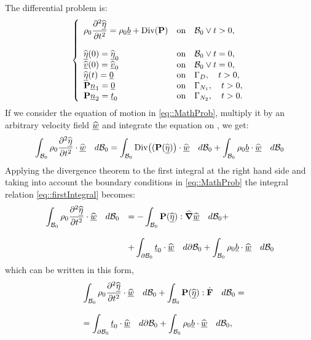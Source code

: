 The differential problem is:
\begin{equation}
\left\{
\begin{array}{lllllll}
  \displaystyle \rho_0\frac{\partial^2\widehat{\underline{\eta}}}{\partial t^2}=\rho_0\underline{b}+\text{Div}(\textbf{P}) & \text{on} \quad \mathcal{B}_0 \vee t>0,\\
  \\
  \widehat{\underline{\eta}}(0)=\widehat{\underline{\eta}}_0 & \text{on} \quad \mathcal{B}_0 \vee t=0,\\
  \widehat{\underline{v}}(0)=\widehat{\underline{v}}_0 & \text{on} \quad \mathcal{B}_0 \vee t=0,\\
  \widehat{\underline{\eta}}(t)=\underline{0} & \text{on} \quad \Gamma_D, \quad t>0,\\
  \textbf{P}\underline{n}_1=\underline{0} & \text{on} \quad \Gamma_{N_1}, \quad t>0,\\
  \textbf{P}\underline{n}_2=\underline{t}_0 & \text{on} \quad \Gamma_{N_2}, \quad t>0.\\
\end{array}\right.
\label{eq::MathProb}
\end{equation}
If we consider the equation of motion in \eqref{eq::MathProb}, multiply it by an arbitrary velocity field $\widehat{\underline{w}}$ and integrate the equation on \RefCon, we get:
\begin{equation}
  \displaystyle \int_{\mathcal{B}_0}\rho_0\frac{\partial^2 \widehat{\underline{\eta}}}{\partial t^2}\cdot\widehat{\underline{w}}\quad d\mathcal{B}_0 = \int_{\mathcal{B}_0}\text{Div}\big((\textbf{P}(\widehat{\underline{\eta}})\big)\cdot\widehat{\underline{w}}\quad d\mathcal{B}_0 + \int_{\mathcal{B}_0}\rho_0\underline{b}\cdot\widehat{\underline{w}}\quad d\mathcal{B}_0
  \label{eq::firstIntegral}
\end{equation}
Applying the divergence theorem to the first integral at the right hand side and taking into account the boundary conditions in \eqref{eq::MathProb} the integral relation \eqref{eq::firstIntegral} becomes:
\begin{equation}
  \begin{array}{lll}
    \displaystyle \int_{\mathcal{B}_0}\rho_0\frac{\partial^2 \widehat{\underline{\eta}}}{\partial t^2}\cdot\widehat{\underline{w}}\quad d\mathcal{B}_0  & = \displaystyle - \int_{\mathcal{B}_0}\textbf{P}(\widehat{\underline{\eta}}):\widehat{\boldsymbol{\nabla}}\widehat{\underline{w}}\quad d\mathcal{B}_0 + \\
    \\
    & \displaystyle + \int_{\partial \mathcal{B}_0}\underline{t}_0\cdot\widehat{\underline{w}}\quad d\partial\mathcal{B}_0 + \int_{\mathcal{B}_0}\rho_0 \underline{b}\cdot\widehat{\underline{w}}\quad d\mathcal{B}_0
    \end{array}
  \label{eq::secondIntegral}
\end{equation}
which can be written in this form,
\begin{equation}
  \begin{array}{lll}
    & \displaystyle \int_{\mathcal{B}_0}\rho_0\frac{\partial^2 \widehat{\underline{\eta}}}{\partial t^2}\cdot\widehat{\underline{w}}\quad d\mathcal{B}_0  + \int_{\mathcal{B}_0}\textbf{P}(\widehat{\underline{\eta}}):\dot{\textbf{F}}\quad d\mathcal{B}_0 = \\
    \\
    & \displaystyle = \int_{\partial \mathcal{B}_0}\underline{t}_0\cdot\widehat{\underline{w}}\quad d\partial\mathcal{B}_0 + \int_{\mathcal{B}_0}\rho_0 \underline{b}\cdot\widehat{\underline{w}}\quad d\mathcal{B}_0,
    \end{array}
  \label{eq::secondIntegral}
\end{equation}
